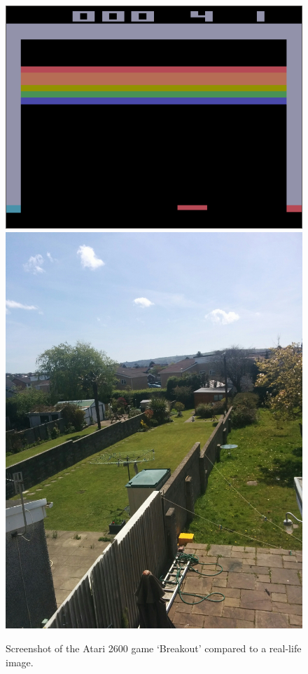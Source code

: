 \documentclass[10pt]{article}
\begin{document}
		\begin{figure}[h]				
			\includegraphics[scale=0.5]{img/screenshot}
			\includegraphics[scale=0.06]{img/real}
			\centering
			\caption{Screenshot of the Atari 2600 game `Breakout' compared to a real-life image.}
			\label{fig:screenshot}
		\end{figure}
	
\end{document}
